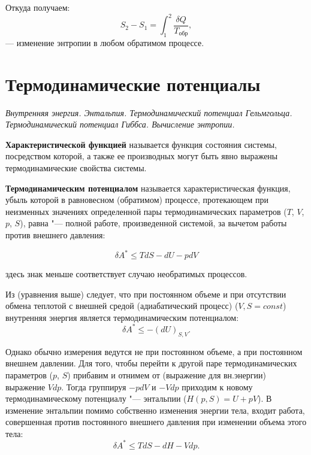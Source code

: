 \documentclass[12pt,a4paper,oneside]{book}
\begin{document}
Откуда получаем:
\begin{equation}
	S_2 - S_1 = \int_1^2 \frac{\delta Q}{T_\text{обр}},
\end{equation}
--- изменение энтропии в любом обратимом процессе.




\newpage
\section{Термодинамические потенциалы}
{\it Внутренняя энергия. Энтальпия. Термодинамический потенциал Гельмгольца. Термодинамический потенциал Гиббса. Вычисление энтропии.}

{\bf Характеристической функцией} называется функция состояния системы, посредством которой, а также ее производных могут быть явно выражены термодинамические свойства системы.

{\bf Термодинамическим потенциалом} называется характеристическая функция, убыль которой в равновесном (обратимом) процессе, протекающем при неизменных значениях определенной пары термодинамических параметров ($T$, $V$, $p$, $S$), равна "--- полной работе, произведенной системой, за вычетом работы против внешнего давления:

\begin{equation}
	\delta A^{*} \leq T dS - d U - p dV 
\end{equation}

здесь знак меньше соответствует случаю необратимых процессов.

Из (уравнения выше) следует, что при постоянном объеме и при отсутствии обмена теплотой с внешней средой (адиабатический процесс) ($V, S = const$) внутренняя энергия является термодинамическим потенциалом:
\begin{equation}
	\delta A^{*} \leq - (d U)_{S,V}.
\end{equation}

Однако обычно измерения ведутся не при постоянном объеме, а при постоянном внешнем давлении. Для того, чтобы перейти к другой паре термодинамических параметров ($p$, $S$) прибавим и отнимем от (выражение для вн.энергии) выражение $Vdp$. Тогда группируя $-p dV$ и $-Vdp$ приходим к новому термодинамическому потенциалу "--- энтальпии ($H(p,S) = U + pV$).  В изменение энтальпии помимо собственно изменения энергии тела, входит работа, совершенная против постоянного внешнего давления при изменении объема этого тела:  
\begin{equation}
	\delta A^{*} \leq T dS - d H - V dp.
\end{equation}
\end{document}
